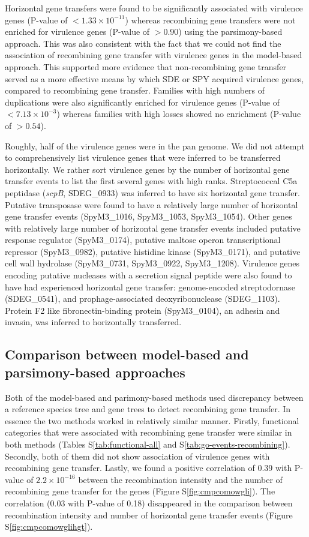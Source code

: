 \documentclass[english]{article}
\begin{document}
Horizontal gene transfers were found to be significantly associated with
virulence genes (P-value of $<1.33 \times 10^{-11}$) whereas recombining gene
transfers were not enriched for virulence genes (P-value of $>0.90$) using the
parsimony-based approach.  This was also consistent with the fact that we could
not find the association of recombining gene transfer with virulence genes in
the model-based approach.  This supported more evidence that non-recombining
gene transfer served as a more effective means by which SDE or SPY acquired
virulence genes, compared to recombining gene transfer.  
Families with high numbers of duplications were also significantly enriched for
virulence genes (P-value of $<7.13 \times 10^{-3}$) whereas families with high
losses showed no enrichment (P-value of $>0.54$). 

Roughly, half of the virulence genes were in the pan genome.  We did not attempt
to comprehensively list virulence genes that were inferred to be transferred
horizontally. We rather sort virulence genes by the number of horizontal gene
transfer events to list the first several genes with high ranks.  Streptococcal
C5a peptidase (\textit{scpB}, SDEG\_0933) was inferred to have six horizontal
gene transfer.  Putative transposase were found to have a relatively large
number of horizontal gene transfer events (SpyM3\_1016, SpyM3\_1053,
SpyM3\_1054). Other genes with relatively large number of horizontal gene
transfer events included putative response regulator (SpyM3\_0174), putative
maltose operon transcriptional repressor (SpyM3\_0982), putative histidine
kinase (SpyM3\_0171), and putative cell wall hydrolase (SpyM3\_0731,
SpyM3\_0922, SpyM3\_1208).  Virulence genes encoding putative nucleases with a
secretion signal peptide were also found to have had experienced horizontal gene
transfer: genome-encoded streptodornase (SDEG\_0541), and prophage-associated
deoxyribonuclease (SDEG\_1103).  Protein F2 like fibronectin-binding protein
(SpyM3\_0104), an adhesin and invasin, was inferred to horizontally
transferred.

\subsection{Comparison between model-based and parsimony-based approaches}

Both of the model-based and parimony-based methods used discrepancy between a
reference species tree and gene trees to detect recombining gene transfer. In
essence the two methods worked in relatively similar manner. Firstly, functional
categories that were associated with recombining gene transfer were similar in
both methods (Tables S\ref{tab:functional-all} and
S\ref{tab:go-events-recombining}).  Secondly, both of them did not show
association of virulence genes with recombining gene transfer. Lastly, we found
a positive correlation of 0.39 with P-value of $2.2\times10^{-16}$ between the
recombination intensity and the number of recombining gene transfer for the
genes (Figure S\ref{fig:cmpcomowgli}).  The correlation (0.03 with P-value of
0.18) disappeared in the comparison between recombination intensity and number
of horizontal gene transfer events (Figure S\ref{fig:cmpcomowglihgt}).
\end{document}
